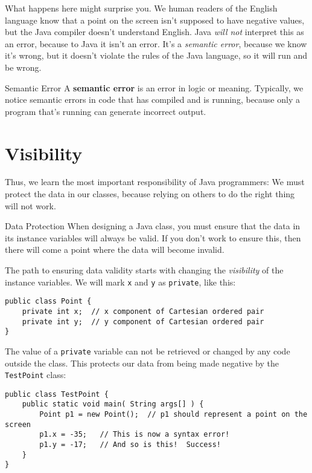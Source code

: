What happens here might surprise you.  We human readers of the English language know that a point on the screen isn't supposed to have negative values, but the Java compiler doesn't understand English.  Java \textit{will not} interpret this as an error, because to Java it isn't an error.  It's a \textit{semantic error}, because we know it's wrong, but it doesn't violate the rules of the Java language, so it will run and be wrong.

\begin{defn}{Semantic Error}
    A \textbf{semantic error} is an error in logic or meaning.  Typically, we notice semantic errors in code that has compiled and is running, because only a program that's running can generate incorrect output.
\end{defn}

\section{Visibility}

Thus, we learn the most important responsibility of Java programmers: We must protect the data in our classes, because relying on others to do the right thing will not work.

\begin{tip}{Data Protection}
    When designing a Java class, you must ensure that the data in its instance variables will always be valid.  If you don't work to ensure this, then there will come a point where the data will become invalid.
\end{tip}

The path to ensuring data validity starts with changing the \textit{visibility} of the instance variables.  We will mark \texttt{x} and \texttt{y} as \texttt{private}, like this:

\begin{verbatim}
public class Point {
    private int x;  // x component of Cartesian ordered pair
    private int y;  // y component of Cartesian ordered pair
}
\end{verbatim}

The value of a \texttt{private} variable can not be retrieved or changed by any code outside the class.  This protects our data from being made negative by the \texttt{TestPoint} class:

\begin{verbatim}
public class TestPoint {
    public static void main( String args[] ) {
        Point p1 = new Point();  // p1 should represent a point on the screen
        p1.x = -35;   // This is now a syntax error!
        p1.y = -17;   // And so is this!  Success!
    }
}
\end{verbatim}

